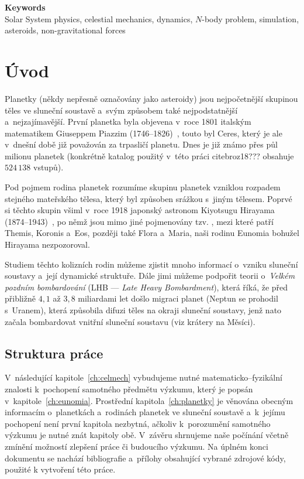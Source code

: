 \documentclass[A4paper, 12pt, oneside]{book}
\begin{document}
{\large \bfseries Keywords}\\
Solar System physics, celestial mechanics, dynamics, $N$-body problem, simulation, asteroids, non-gravitational forces

\newpage

\tableofcontents

\newpage 
\pagestyle{headings} %
\chapter{Úvod} \label{ch:uvod}
Planetky (někdy nepřesně označovány jako asteroidy) jsou nejpočetnější skupinou těles ve sluneční soustavě a~svým způsobem také nejpodstatnější a~nejzajímavější. První planetka byla objevena v~roce 1801 italským matematikem Giuseppem Piazzim (1746--1826)~\cite{wiki:piazzi}, touto  byl Ceres, který je ale v~dnešní době již považován za trpasličí planetu. Dnes je již známo přes půl milionu planetek (konkrétně katalog použitý v~této práci cite{broz18}??? obsahuje $524\,138$ vstupů).

Pod pojmem rodina planetek rozumíme skupinu planetek vzniklou rozpadem stejného mateřského tělesa, který byl způsoben srážkou s~jiným tělesem. Poprvé si těchto skupin všiml v~roce 1918 japonský astronom Kiyotsugu Hirayama (1874--1943)~\cite{wiki:hirayama}, po němž jsou mimo jiné pojmenovány tzv. , mezi které patří Themis, Koronis a~Eos, později také Flora a~Maria, naši rodinu Eunomia bohužel Hirayama nezpozoroval. 

Studiem těchto kolizních rodin můžeme zjistit mnoho informací o~vzniku sluneční soustavy a~její dynamické struktuře. Dále jimi můžeme podpořit teorii o~\textit{Velkém pozdním bombardování} (LHB --- \textit{Late Heavy Bombardment}), která říká, že před přibližně $4,1$ až $3,8$ miliardami let došlo migraci planet (Neptun se prohodil s~Uranem), která způsobila difuzi těles na okraji sluneční soustavy, jenž nato začala bombardovat vnitřní sluneční soustavu (viz krátery na Měsíci).

\section{Struktura práce}
V~následující kapitole~\ref{ch:celmech} vybudujeme nutné matematicko--fyzikální znalosti k~pochopení samotného předmětu výzkumu, který je popsán v~kapitole~\ref{ch:eunomia}. Prostřední kapitola~\ref{ch:planetky} je věnována obecným informacím o~planetkách a~rodinách planetek ve sluneční soustavě a~k~jejímu pochopení není první kapitola nezbytná, ačkoliv k~porozumění samotného výzkumu je nutné znát kapitoly obě. V~závěru shrnujeme naše počínání včetně zmínění možností zlepšení práce či budoucího výzkumu. Na úplném konci dokumentu se nachází bibliografie a~přílohy obsahující vybrané zdrojové kódy, použité k vytvoření této práce.
\end{document}

